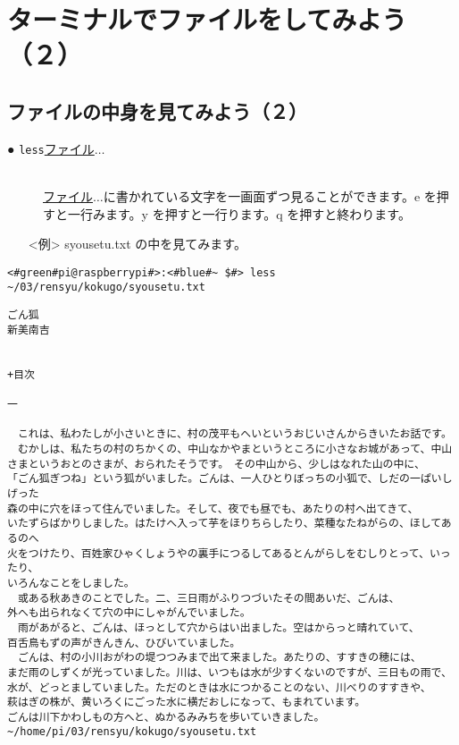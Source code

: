 \newpage
\section{ターミナルでファイルをしてみよう（２）}

\subsection{ファイルの中身を見てみよう（２）}
\begin{description}
\item[● \texttt{less}\textvisiblespace \underline{ファイル}$\ldots$]\mbox{}\\
\underline{ファイル}$\ldots$に書かれている文字を一画面ずつ見ることができます。e を押すと一行みます。y を押すと一行ります。q を押すと終わります。

\end{description}
\begin{itemize}
\item[<例>]syousetu.txt の中を見てみます。
\end{itemize}
\begin{lstlisting}[caption=lessの例, label=less]
<#green#pi@raspberrypi#>:<#blue#~ $#> less ~/03/rensyu/kokugo/syousetu.txt
\end{lstlisting}
\begin{lstlisting}[caption=lessの結果, label=less-result]
ごん狐
新美南吉


+目次

一

　これは、私わたしが小さいときに、村の茂平もへいというおじいさんからきいたお話です。
　むかしは、私たちの村のちかくの、中山なかやまというところに小さなお城があって、中山
さまというおとのさまが、おられたそうです。　その中山から、少しはなれた山の中に、
「ごん狐ぎつね」という狐がいました。ごんは、一人ひとりぼっちの小狐で、しだの一ぱいしげった
森の中に穴をほって住んでいました。そして、夜でも昼でも、あたりの村へ出てきて、
いたずらばかりしました。はたけへ入って芋をほりちらしたり、菜種なたねがらの、ほしてあるのへ
火をつけたり、百姓家ひゃくしょうやの裏手につるしてあるとんがらしをむしりとって、いったり、
いろんなことをしました。
　或ある秋あきのことでした。二、三日雨がふりつづいたその間あいだ、ごんは、
外へも出られなくて穴の中にしゃがんでいました。
　雨があがると、ごんは、ほっとして穴からはい出ました。空はからっと晴れていて、
百舌鳥もずの声がきんきん、ひびいていました。
　ごんは、村の小川おがわの堤つつみまで出て来ました。あたりの、すすきの穂には、
まだ雨のしずくが光っていました。川は、いつもは水が少すくないのですが、三日もの雨で、
水が、どっとましていました。ただのときは水につかることのない、川べりのすすきや、
萩はぎの株が、黄いろくにごった水に横だおしになって、もまれています。
ごんは川下かわしもの方へと、ぬかるみみちを歩いていきました。
~/home/pi/03/rensyu/kokugo/syousetu.txt
\end{lstlisting}

